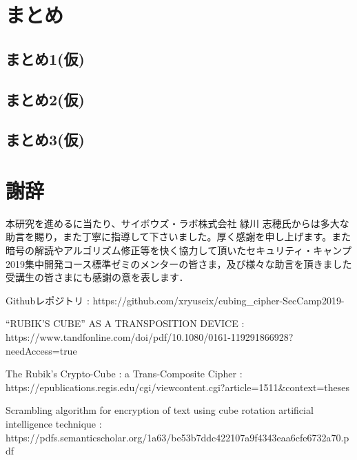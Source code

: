 \documentclass{jsarticle}
\begin{document}
\section{まとめ}
\subsection{まとめ1(仮)}
\subsection{まとめ2(仮)}
\subsection{まとめ3(仮)}
\section{謝辞}
本研究を進めるに当たり、サイボウズ・ラボ株式会社 緑川 志穂氏からは多大な助言を賜り，また丁寧に指導して下さいました。厚く感謝を申し上げます。また暗号の解読やアルゴリズム修正等を快く協力して頂いたセキュリティ・キャンプ2019集中開発コース標準ゼミのメンターの皆さま，及び様々な助言を頂きました受講生の皆さまにも感謝の意を表します．

\newpage 
\begin{flushleft}
\begin{thebibliography}{}

 Githubレポジトリ : https://github.com/xryuseix/cubing\_cipher-SecCamp2019-

 “RUBIK'S CUBE” AS A TRANSPOSITION DEVICE : https://www.tandfonline.com/doi/pdf/10.1080/0161-119291866928?needAccess=true

The Rubik's Crypto-Cube : a Trans-Composite Cipher : https://epublications.regis.edu/cgi/viewcontent.cgi?article=1511\&context=theses

Scrambling algorithm for encryption of text using cube rotation artificial intelligence technique : https://pdfs.semanticscholar.org/1a63/be53b7ddc422107a9f4343eaa6cfe6732a70.pdf

\end{thebibliography}
\end{flushleft}
\end{document}
